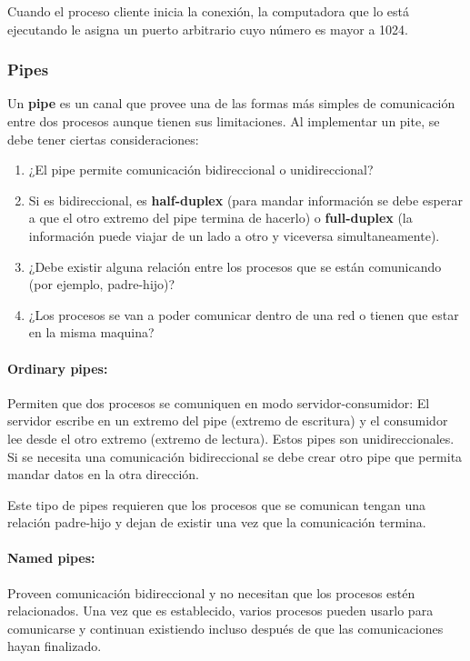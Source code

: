 Cuando el proceso cliente inicia la conexión, la computadora que lo está ejecutando le asigna un puerto arbitrario cuyo número es mayor a 1024.
\subsubsection{Pipes}
Un \textbf{pipe} es un canal que provee una de las formas más simples de comunicación entre dos procesos aunque tienen sus limitaciones. Al implementar un pite, se debe tener ciertas consideraciones: 
\begin{enumerate}
	\item ¿El pipe permite comunicación bidireccional o unidireccional?
	\item Si es bidireccional, es \textbf{half-duplex} (para mandar información se debe esperar a que el otro extremo del pipe termina de hacerlo) o \textbf{full-duplex} (la información puede viajar de un lado a otro y viceversa simultaneamente).
	\item ¿Debe existir alguna relación entre los procesos que se están comunicando (por ejemplo, padre-hijo)?
	\item ¿Los procesos se van a poder comunicar dentro de una red o tienen que estar en la misma maquina?
\end{enumerate}

\paragraph{Ordinary pipes:} Permiten que dos procesos se comuniquen en modo servidor-consumidor: El servidor escribe en un extremo del pipe (extremo de escritura) y el consumidor lee desde el otro extremo (extremo de lectura). Estos pipes son unidireccionales. Si se necesita una comunicación bidireccional se debe crear otro pipe que permita mandar datos en la otra dirección.

Este tipo de pipes requieren que los procesos que se comunican tengan una relación padre-hijo y dejan de existir una vez que la comunicación termina.

\paragraph{Named pipes:} Proveen comunicación bidireccional y no necesitan que los procesos estén relacionados. Una vez que es establecido, varios procesos pueden usarlo para comunicarse y continuan existiendo incluso después de que las comunicaciones hayan finalizado.


